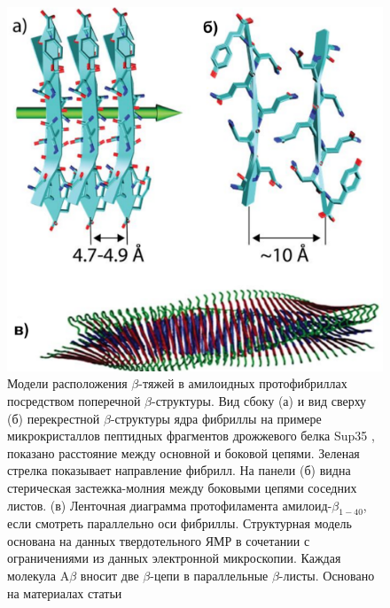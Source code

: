 \begin{figure} [H]
    \centering
    \includegraphics[width=\textwidth]{images/p4/punkt1/part4_p1_f2.pdf}
    \caption[Модели расположения $\beta$-тяжей в амилоидных протофибриллах]{Модели расположения $\beta$-тяжей в амилоидных протофибриллах посредством поперечной $\beta$-структуры. Вид сбоку (а) и вид сверху (б) перекрестной $\beta$-структуры ядра фибриллы на примере микрокристаллов пептидных фрагментов дрожжевого белка Sup35 \cite{nelson_structure_2005}, показано расстояние между основной и боковой цепями. Зеленая стрелка показывает направление фибрилл. На панели (б) видна стерическая застежка-молния между боковыми цепями соседних листов. (в) Ленточная диаграмма протофиламента амилоид-$\beta_{1-40}$, если смотреть параллельно оси фибриллы. Структурная модель основана на данных твердотельного ЯМР в сочетании с ограничениями из данных электронной микроскопии. Каждая молекула A$\beta$ вносит две $\beta$-цепи в параллельные $\beta$-листы. Основано на материалах статьи \cite{petkova_experimental_2006}}
    \label{fig:p4_p1_f2}
\end{figure}
  
